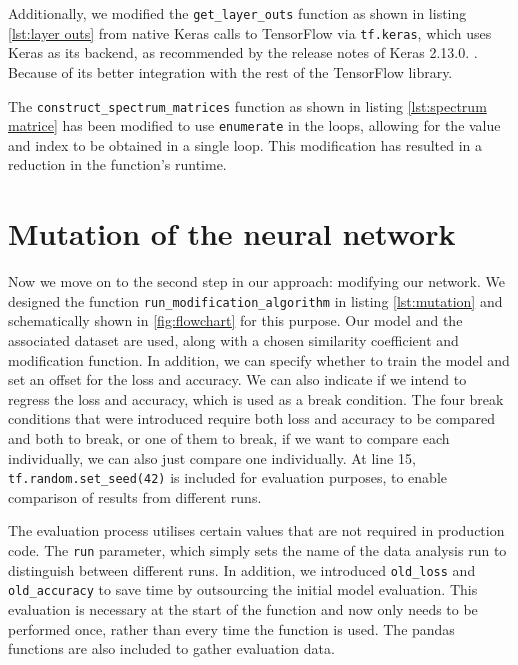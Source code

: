 

Additionally, we modified the \texttt{get\_layer\_outs} function as shown in listing \ref{lst:layer outs} from native Keras \cite{chollet_keras_2015} calls to TensorFlow \cite{martin_abadi_tensorflow_2015} via \texttt{tf.keras}, which uses Keras as its backend, as recommended by the release notes of Keras 2.13.0. .
Because of its better integration with the rest of the TensorFlow library.



The \texttt{construct\_spectrum\_matrices} function as shown in listing \ref{lst:spectrum matrice} has been modified to use \texttt{enumerate} in the loops, allowing for the value and index to be obtained in a single loop.
This modification has resulted in a reduction in the function's runtime.



\section{Mutation of the neural network}\label{sec:mutation-of-the-neural-network}
Now we move on to the second step in our approach: modifying our network.
We designed the function \texttt{run\_modification\_algorithm} in listing \ref{lst:mutation} and schematically shown in \ref{fig:flowchart} for this purpose.
Our model and the associated dataset are used, along with a chosen similarity coefficient and modification function.
In addition, we can specify whether to train the model and set an offset for the loss and accuracy.
We can also indicate if we intend to regress the loss and accuracy, which is used as a break condition.
The four break conditions that were introduced require both loss and accuracy to be compared and both to break, or one of them to break, if we want to compare each individually, we can also just compare one individually.
At line 15, \texttt{tf.random.set\_seed(42)} is included for evaluation purposes, to enable comparison of results from different runs.

The evaluation process utilises certain values that are not required in production code.
The \texttt{run} parameter, which simply sets the name of the data analysis run to distinguish between different runs.
In addition, we introduced \texttt{old\_loss} and \texttt{old\_accuracy} to save time by outsourcing the initial model evaluation.
This evaluation is necessary at the start of the function and now only needs to be performed once, rather than every time the function is used.
The pandas functions are also included to gather evaluation data.

